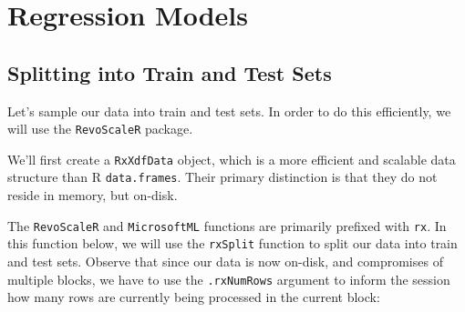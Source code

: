\documentclass[]{book}
\newenvironment{Shaded}{\begin{snugshade}}{\end{snugshade}}
\newcommand{\KeywordTok}[1]{\textcolor[rgb]{0.13,0.29,0.53}{\textbf{#1}}}
\newcommand{\DataTypeTok}[1]{\textcolor[rgb]{0.13,0.29,0.53}{#1}}
\newcommand{\DecValTok}[1]{\textcolor[rgb]{0.00,0.00,0.81}{#1}}
\newcommand{\StringTok}[1]{\textcolor[rgb]{0.31,0.60,0.02}{#1}}
\newcommand{\OtherTok}[1]{\textcolor[rgb]{0.56,0.35,0.01}{#1}}
\newcommand{\OperatorTok}[1]{\textcolor[rgb]{0.81,0.36,0.00}{\textbf{#1}}}
\newcommand{\NormalTok}[1]{#1}
\theoremstyle{definition}
\theoremstyle{definition}
\theoremstyle{definition}
\theoremstyle{remark}
\begin{document}
\chapter{Regression Models}\label{regression-models}

\section{Splitting into Train and Test
Sets}\label{splitting-into-train-and-test-sets}

Let's sample our data into train and test sets. In order to do this
efficiently, we will use the \texttt{RevoScaleR} package.

We'll first create a \texttt{RxXdfData} object, which is a more
efficient and scalable data structure than R \texttt{data.frames}. Their
primary distinction is that they do not reside in memory, but on-disk.

\begin{Shaded}
\end{Shaded}

The \texttt{RevoScaleR} and \texttt{MicrosoftML} functions are primarily
prefixed with \texttt{rx}. In this function below, we will use the
\texttt{rxSplit} function to split our data into train and test sets.
Observe that since our data is now on-disk, and compromises of multiple
blocks, we have to use the \texttt{.rxNumRows} argument to inform the
session how many rows are currently being processed in the current
block:
\end{document}

